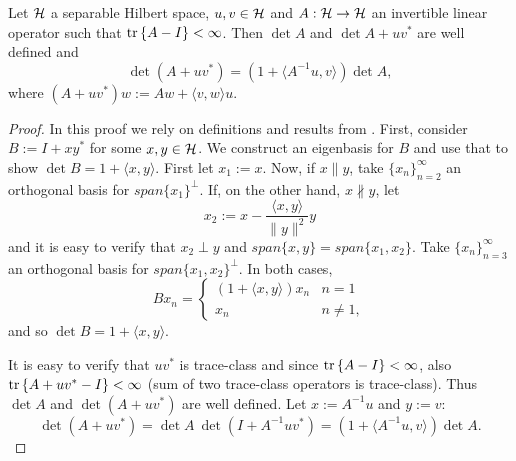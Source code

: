 \documentclass{amsart}
\numberwithin{equation}{section}
\begin{document}
\begin{lemma}\label{lemma:MDL}
  Let $\mathcal{H}$ a separable Hilbert space, $u,v\in \mathcal{H}$ and $A: \mathcal{H} \to
  \mathcal{H}$ an invertible linear operator such that $\textup{tr}\left \{A-I \right \} <
  \infty$. Then $\det A$ and $\det A + uv^*$ are well defined and
  \begin{equation*}
    \det (A + uv^*) = (1 + \langle A^{-1} u, v \rangle ) \det A,
  \end{equation*}
  where $(A + uv^*)w := Aw + \langle v,w \rangle u$.
\end{lemma}
\begin{proof}
  In this proof we rely on definitions and results from
  \cite{Simon77}. First, consider $B := I + xy^*$ for some $x,y \in
  \mathcal{H}$. We construct an eigenbasis for $B$ and use that to show $\det
  B = 1 + \langle x, y \rangle$. First let $x_1 := x$.  Now, if $x
  \parallel y$, take $\{x_n \}_{n=2}^{\infty}$ an orthogonal basis for
  $span\{x_1\} ^{\perp}$. If, on the other hand, $x \nparallel y$, let
  \begin{equation*}
    x_2 := x - \frac{ \langle x, y\rangle}{\|y\|^2}y
  \end{equation*}
  and it is easy to verify that $x_2 \perp y$ and $span \{x,y\} = span
  \{x_1,x_2\}$. Take $\{x_n \}_{n=3}^{\infty}$ an orthogonal basis for
  $span\{x_1,x_2\} ^{\perp}$. In both cases,
  \begin{equation*}
    B x_n =
    \begin{cases}
      (1 + \langle x, y \rangle) x_n & n = 1 \\
      x_n                            & n \neq 1,
    \end{cases}
  \end{equation*}
  and so $\det B = 1 + \langle x, y \rangle$.
  
  It is easy to verify that $uv^*$ is trace-class and since $\textup{tr}\left \{A-I \right \}
  < \infty$, also $\textup{tr}\left \{A + uv^* - I \right \} < \infty$ (sum of two trace-class
  operators is trace-class). Thus $\det A$ and $\det (A+uv^*)$ are
  well defined. Let $x:=A^{-1}u$ and $y := v$:
  \begin{equation*}
    \det (A + uv^*) = \det A \ \det(I+A^{-1}uv^*) =
    (1 + \langle A^{-1}u, v \rangle) \det A .
  \end{equation*}
\end{proof}
\end{document}
